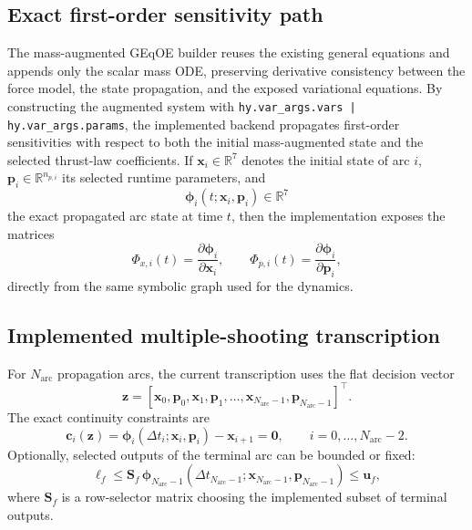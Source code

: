 \documentclass[11pt]{article}
\begin{document}
\subsection{Exact first-order sensitivity path}

The mass-augmented GEqOE builder reuses the existing general equations and
appends only the scalar mass ODE, preserving derivative consistency between the
force model, the state propagation, and the exposed variational equations. By
constructing the augmented system with
\texttt{hy.var\_args.vars | hy.var\_args.params}, the implemented backend
propagates first-order sensitivities with respect to both the initial
mass-augmented state and the selected thrust-law coefficients. If
$\bm{x}_i\in\mathbb{R}^7$ denotes the initial state of arc $i$,
$\bm{p}_i\in\mathbb{R}^{n_{p,i}}$ its selected runtime parameters, and
\begin{equation}
    \bm{\phi}_i(t;\bm{x}_i,\bm{p}_i)
    \in \mathbb{R}^{7}
\end{equation}
the exact propagated arc state at time $t$, then the implementation exposes the
matrices
\begin{equation}
    \Phi_{x,i}(t) = \frac{\partial \bm{\phi}_i}{\partial \bm{x}_i},
    \qquad
    \Phi_{p,i}(t) = \frac{\partial \bm{\phi}_i}{\partial \bm{p}_i},
\end{equation}
directly from the same symbolic graph used for the dynamics.

\subsection{Implemented multiple-shooting transcription}

For $N_{\mathrm{arc}}$ propagation arcs, the current transcription uses the
flat decision vector
\begin{equation}
    \bm{z}
    =
    \left[
        \bm{x}_0,\bm{p}_0,\bm{x}_1,\bm{p}_1,\ldots,
        \bm{x}_{N_{\mathrm{arc}}-1},\bm{p}_{N_{\mathrm{arc}}-1}
    \right]^\top.
\end{equation}
The exact continuity constraints are
\begin{equation}
    \bm{c}_i(\bm{z})
    =
    \bm{\phi}_i(\Delta t_i;\bm{x}_i,\bm{p}_i) - \bm{x}_{i+1}
    =
    \bm{0},
    \qquad
    i=0,\ldots,N_{\mathrm{arc}}-2.
\end{equation}
Optionally, selected outputs of the terminal arc can be bounded or fixed:
\begin{equation}
    \bm{\ell}_{f}
    \le
    \bm{S}_f\,
    \bm{\phi}_{N_{\mathrm{arc}}-1}(\Delta t_{N_{\mathrm{arc}}-1};
    \bm{x}_{N_{\mathrm{arc}}-1},\bm{p}_{N_{\mathrm{arc}}-1})
    \le
    \bm{u}_{f},
\end{equation}
where $\bm{S}_f$ is a row-selector matrix choosing the implemented subset of
terminal outputs.
\end{document}
